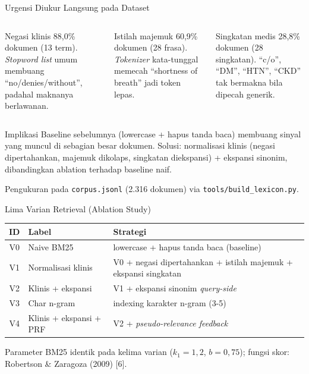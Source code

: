 \documentclass[aspectratio=169,10pt]{beamer}
\newcommand{\source}[1]{\vfill{\scriptsize\raggedright\color{ugmBlueMid}#1\par}\vspace*{0.42cm}}
\begin{document}
\begin{frame}{Urgensi Diukur Langsung pada Dataset}
  \small
  \begin{columns}[T,onlytextwidth]
    \begin{block}{Negasi klinis}
      88,0\% dokumen (13 term). \textit{Stopword list} umum membuang ``no/denies/without'', padahal maknanya berlawanan.
    \end{block}
    \begin{block}{Istilah majemuk}
      60,9\% dokumen (28 frasa). \textit{Tokenizer} kata-tunggal memecah ``shortness of breath'' jadi token lepas.
    \end{block}
    \begin{block}{Singkatan medis}
      28,8\% dokumen (28 singkatan). ``c/o'', ``DM'', ``HTN'', ``CKD'' tak bermakna bila dipecah generik.
    \end{block}
  \end{columns}
  \vspace{0.15cm}
  \begin{block}{Implikasi}
    \scriptsize
    Baseline sebelumnya (lowercase + hapus tanda baca) membuang sinyal yang muncul di sebagian besar dokumen. Solusi: normalisasi klinis (negasi dipertahankan, majemuk dikolaps, singkatan diekspansi) + ekspansi sinonim, dibandingkan ablation terhadap baseline naif.
  \end{block}
  \source{Pengukuran pada \texttt{corpus.jsonl} (2.316 dokumen) via \texttt{tools/build\_lexicon.py}.}
\end{frame}




\begin{frame}{Lima Varian Retrieval (Ablation Study)}
  \small
  \renewcommand{\arraystretch}{1.2}
  \begin{tabular}{|c|l|l|}
    \hline
    \textbf{ID} & \textbf{Label}          & \textbf{Strategi}                                                \\
    \hline
    V0          & Naive BM25              & lowercase + hapus tanda baca (baseline)                          \\
    \hline
    V1          & Normalisasi klinis      & V0 + negasi dipertahankan + istilah majemuk + ekspansi singkatan \\
    \hline
    V2          & Klinis + ekspansi       & V1 + ekspansi sinonim \textit{query-side}                        \\
    \hline
    V3          & Char n-gram             & indexing karakter n-gram (3-5)                                   \\
    \hline
    V4          & Klinis + ekspansi + PRF & V2 + \textit{pseudo-relevance feedback}                          \\
    \hline
  \end{tabular}
  \source{Parameter BM25 identik pada kelima varian ($k_1{=}1{,}2$, $b{=}0{,}75$); fungsi skor: Robertson \& Zaragoza (2009) [6].}
\end{frame}
\end{document}
